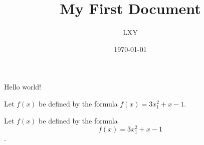 \documentclass{article}
\title{My First Document}
\author{LXY}
\date{\today}       %
\begin{document}
    \maketitle
    Hello world!

    Let $f(x)$ be defined by the formula 
    $f(x)=3x_1^2+x-1$.

    Let $f(x)$ be defined by the formula 
    $$f(x)=3x_1^2+x-1$$.
\end{document}
